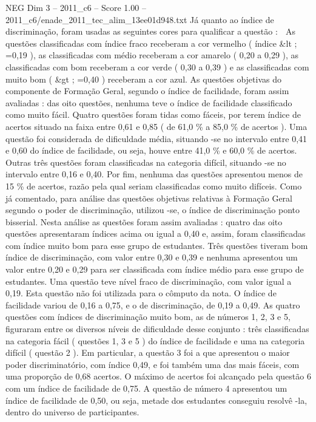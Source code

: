 \begin{textsample}{NEG Dim 3 – 2011\_c6 – Score 1.00 – 2011\_c6/enade\_2011\_tec\_alim\_13ee01d948.txt}
Já quanto ao índice de discriminação, foram usadas as seguintes cores para qualificar a questão :  As questões classificadas com índice fraco receberam a cor vermelho ( índice \&lt ; =0,19 ), as classificadas com médio receberam a cor amarelo ( 0,20 a 0,29 ), as classificadas com bom receberam a cor verde ( 0,30 a 0,39 ) e as classificadas com muito bom ( \&gt ; =0,40 ) receberam a cor azul.
As questões objetivas do componente de Formação Geral, segundo o índice de facilidade, foram assim avaliadas : das oito questões, nenhuma teve o índice de facilidade classificado como muito fácil.
Quatro questões foram tidas como fáceis, por terem índice de acertos situado na faixa entre 0,61 e 0,85 ( de 61,0 \% a 85,0 \% de acertos ).
Uma questão foi considerada de dificuldade média, situando -se no intervalo entre 0,41 e 0,60 do índice de facilidade, ou seja, houve entre 41,0 \% e 60,0 \% de acertos.
Outras três questões foram classificadas na categoria difícil, situando -se no intervalo entre 0,16 e 0,40.
Por fim, nenhuma das questões apresentou menos de 15 \% de acertos, razão pela qual seriam classificadas como muito difíceis.
Como já comentado, para análise das questões objetivas relativas à Formação Geral segundo o poder de discriminação, utilizou -se, o índice de discriminação ponto bisserial.
Nesta análise as questões foram assim avaliadas : quatro das oito questões apresentaram índices acima ou igual a 0,40 e, assim, foram classificadas com índice muito bom para esse grupo de estudantes.
Três questões tiveram bom índice de discriminação, com valor entre 0,30 e 0,39 e nenhuma apresentou um valor entre 0,20 e 0,29 para ser classificada com índice médio para esse grupo de estudantes.
Uma questão teve nível fraco de discriminação, com valor igual a 0,19.
Esta questão não foi utilizada para o cômputo da nota.
O índice de facilidade variou de 0,16 a 0,75, e o de discriminação, de 0,19 a 0,49.
As quatro questões com índices de discriminação muito bom, as de números 1, 2, 3 e 5, figuraram entre os diversos níveis de dificuldade desse conjunto : três classificadas na categoria fácil ( questões 1, 3 e 5 ) do índice de facilidade e uma na categoria difícil ( questão 2 ).
Em particular, a questão 3 foi a que apresentou o maior poder discriminatório, com índice 0,49, e foi também uma das mais fáceis, com uma proporção de 0,68 acertos.
O máximo de acertos foi alcançado pela questão 6 com um índice de facilidade de 0,75.
A questão de número 4 apresentou um índice de facilidade de 0,50, ou seja, metade dos estudantes conseguiu resolvê -la, dentro do universo de participantes.

\end{textsample}
